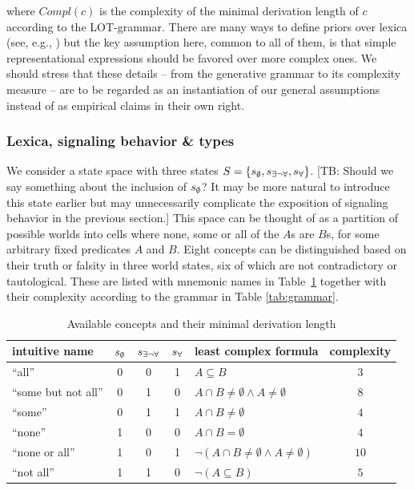 \documentclass[a4paper]{article}
\newcommand{\tb}[1]{\textcolor[rgb]{.8,.33,.0}{[TB: #1]}}%
\newcommand{\set}[1]{\left\{#1\right\}}
\newcommand{\States}{\ensuremath{S}\xspace}		%
\newcommand{\state}{\ensuremath{s}\xspace}		%
\newcommand{\mystate}[1]{\ensuremath{\state_{\text{#1}}}\xspace} %
\newcommand{\ssome}{\mystate{\ensuremath{\exists\neg\forall}}}
\newcommand{\sall}{\mystate{\ensuremath{\forall}}}
\newcommand{\snone}{\mystate{\ensuremath{\emptyset}}}
\begin{document}
where $Compl(c)$ is the complexity of the minimal derivation length of $c$ according to the LOT-grammar. There are many ways to define priors over lexica (see, e.g., \citealt{goodman+etal:2008, piantadosi+etal:2012a}) but the key assumption here, common to all of them, is that simple representational expressions should be favored over more complex ones. We should stress that these details -- from the generative grammar to its complexity measure -- are to be regarded as an instantiation of our general assumptions instead of as empirical claims in their own right. 




\subsubsection{Lexica, signaling behavior \& types}
We consider a state space with three states $\States = \set{\snone, \ssome, \sall}$. \tb{Should we say something about the inclusion of $\snone$? It may be more natural to introduce this state earlier but may unnecessarily complicate the exposition of signaling behavior in the previous section.} This space can be
thought of as a partition of possible worlds into cells where none, some or all of the $A$s are
$B$s, for some arbitrary fixed predicates $A$ and $B$. Eight concepts can be distinguished
based on their truth or falsity in three world states, six of which are not contradictory
 or tautological. These are listed with mnemonic names in
Table~\ref{tab:concepts} together with their complexity according to the grammar in Table \ref{tab:grammar}.

\begin{table}
  \centering
\begin{center}
  \begin{tabular}{lccclc}
    \toprule
    intuitive name
    & \snone
    & \ssome
    & \sall
    & least complex formula
    & complexity
    \\ \midrule
    ``all''
    & 0
    & 0
    & 1
    & $A \subseteq B$
    & $3$
    \\
    ``some but not all''
    & 0
    & 1
    & 0
    & $A \cap B \neq \emptyset \wedge A \neq \emptyset$
    & $8$
    \\    
    ``some''
    & 0
    & 1
    & 1
    & $A \cap B \neq \emptyset$
    & $4$
    \\
    ``none''
    & 1
    & 0
    & 0
    & $A \cap B = \emptyset$
    & $4$
    \\
    ``none or all''
    & 1
    & 0
    & 1
    & $\neg(A \cap B \neq \emptyset \wedge A \neq \emptyset)$
    & $10$
    \\
    ``not all''
    & 1
    & 1
    & 0
    & $\neg (A \subseteq B)$
    & $5$
    \\
    \bottomrule
  \end{tabular}
\end{center}
\caption{Available concepts and their minimal derivation length}
\label{tab:concepts}
\end{table}
\end{document}
